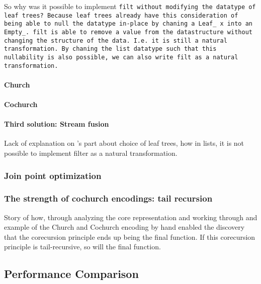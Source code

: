 So why was it possible to implement \tt{filt} without modifying the datatype of leaf trees?
Because leaf trees already have this consideration of being able to null the datatype in-place by chaning a \tt{Leaf\_ x} into an \tt{Empty\_}.
\tt{filt} is able to remove a value from the datastructure without changing the structure of the data. I.e. it is still a natural transformation.
By chaning the list datatype such that this nullability is also possible, we can also write \tt{filt} as a natural transformation.

    


\paragraph{Church}

\paragraph{Cochurch}

\paragraph{Third solution: Stream fusion}

Lack of explanation on \cite{Harper2011}'s part about choice of leaf trees, how in lists, it is not possible to implement filter as a natural transformation.
\subsubsection{Join point optimization}\label{sec:join}
\subsubsection{The strength of cochurch encodings: tail recursion}\label{sec:tail}
Story of how, through analyzing the core representation and working through and example of the Church and Cochurch encoding by hand enabled the discovery that the corecursion principle ends up being the final function.
If this corecursion principle is tail-recursive, so will the final function.

\subsection{Performance Comparison}



